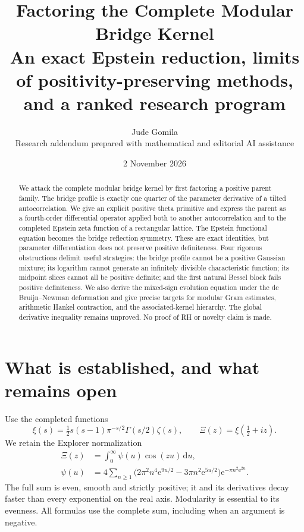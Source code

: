 \documentclass[11pt,letterpaper]{article}
\title{\textbf{Factoring the Complete Modular Bridge Kernel}\\[0.4em]
\large An exact Epstein reduction, limits of positivity-preserving methods,\\and a ranked research program}
\author{Jude Gomila\\\small Research addendum prepared with mathematical and editorial AI assistance}
\date{2 November 2026}
\numberwithin{equation}{section}
\theoremstyle{remark}\newtheorem{remark}[proposition]{Remark}
\newcommand{\dd}{\,\mathrm d}
\newcommand{\ee}{\mathrm e}
\begin{document}
\maketitle
\begin{abstract}
We attack the complete modular bridge kernel by first factoring a positive parent family. The bridge profile is exactly one quarter of the parameter derivative of a tilted autocorrelation. We give an explicit positive theta primitive and express the parent as a fourth-order differential operator applied both to another autocorrelation and to the completed Epstein zeta function of a rectangular lattice. The Epstein functional equation becomes the bridge reflection symmetry. These are exact identities, but parameter differentiation does not preserve positive definiteness. Four rigorous obstructions delimit useful strategies: the bridge profile cannot be a positive Gaussian mixture; its logarithm cannot generate an infinitely divisible characteristic function; its midpoint slices cannot all be positive definite; and the first natural Bessel block fails positive definiteness. We also derive the mixed-sign evolution equation under the de Bruijn--Newman deformation and give precise targets for modular Gram estimates, arithmetic Hankel contraction, and the associated-kernel hierarchy. The global derivative inequality remains unproved. No proof of RH or novelty claim is made.
\end{abstract}

\section{What is established, and what remains open}
Use the completed functions
\begin{equation}
 \xi(s)=\tfrac12s(s-1)\pi^{-s/2}\Gamma(s/2)\zeta(s),
 \qquad \Xi(z)=\xi(\tfrac12+iz).
\end{equation}
We retain the Explorer normalization
\begin{align}
 \Xi(z)&=\int_0^\infty\psi(u)\cos(zu)\dd u,\\
 \psi(u)&=4\sum_{n\ge1}
 \bigl(2\pi^2n^4\ee^{9u/2}-3\pi n^2\ee^{5u/2}\bigr)
 \ee^{-\pi n^2\ee^{2u}}.
 \label{eq:psi}
\end{align}
The full sum is even, smooth and strictly positive; it and its derivatives decay faster than every exponential on the real axis. Modularity is essential to its evenness. All formulas use the complete sum, including when an argument is negative.
\end{document}
